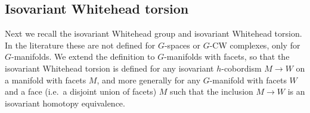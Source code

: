 \documentclass[11pt]{amsart}
\theoremstyle{definition}
\numberwithin{equation}{section}
\numberwithin{figure}{section}
\newcommand{\R}{\mathbb R}
\newcommand{\iso}{\mathrm{iso}}
\newcommand{\St}{\mathrm{St}}
\newcommand{\Wh}{\mathrm{Wh}}
\begin{document}
%	
%	


\subsection{Isovariant Whitehead torsion}

Next we recall the isovariant Whitehead group and isovariant Whitehead torsion. In the literature these are not defined for $G$-spaces or $G$-CW complexes, only for $G$-manifolds. We extend the definition to $G$-manifolds with facets, so that the isovariant Whitehead torsion is defined for any isovariant $h$-cobordism $M \to W$ on a manifold with facets $M$, and more generally for any $G$-manifold with facets $W$ and a face (i.e.~a disjoint union of facets) $M$ such that the inclusion $M \to W$ is an isovariant homotopy equivalence.

\end{document}

